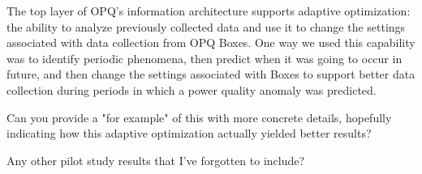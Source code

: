 The top layer of OPQ's information architecture supports adaptive optimization: the ability to analyze previously collected data and use it to change the settings associated with data collection from OPQ Boxes.  One way we used this capability was to identify periodic phenomena, then predict when it was going to occur in future, and then change the settings associated with Boxes to support better data collection during periods in which a power quality anomaly was predicted.

\begin{tcolorbox}[colback=red!5!white,colframe=red!75!black,title=ANTHONY]
Can you provide a "for example" of this with more concrete details, hopefully indicating how this adaptive optimization actually yielded better results?
\end{tcolorbox}

\begin{tcolorbox}[title=ANTHONY AND SERGE]
Any other pilot study results that I've forgotten to include?
\end{tcolorbox}





